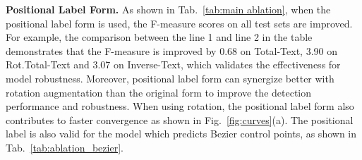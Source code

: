 \documentclass[letterpaper]{article} \usepackage{aaai23}  \usepackage{times}  \usepackage{helvet}  \usepackage{courier}  \usepackage[hyphens]{url}  \usepackage{graphicx} \urlstyle{rm}
\begin{document}
\begin{table}[t!]
    \centering
    \setlength{\tabcolsep}{4pt}
    \caption{Main ablation results of Bezier control point version detector on Total-Text, Rot.Total-Text, and Inverse-Text.}
    \label{tab:ablation_bezier}
\end{table}

\textbf{Positional Label Form.} As shown in Tab.~\ref{tab:main ablation}, when the positional label form is used, the F-measure scores on all test sets are improved. For example, the comparison between the line 1 and line 2 in the table demonstrates that the F-measure is improved by 0.68 on Total-Text, 3.90 on Rot.Total-Text and 3.07 on Inverse-Text, which validates the effectiveness for model robustness. Moreover, positional label form can synergize better with rotation augmentation than the original form to improve the detection performance and robustness. When using rotation, the positional label form also contributes to faster convergence as shown in Fig.~\ref{fig:curves}(a). The positional label is also valid for the model which predicts Bezier control points, as shown in Tab.~\ref{tab:ablation_bezier}.
\end{document}
